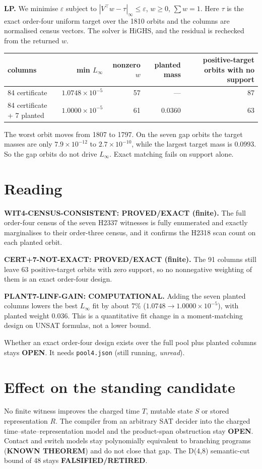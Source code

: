 \documentclass[11pt]{article}
\begin{document}
\textbf{LP.} We minimise $\varepsilon$ subject to $|V^{\top}w-\tau|_\infty\le\varepsilon$, $w\ge0$, $\sum w=1$. Here $\tau$ is the exact order-four uniform target over the 1810 orbits and the columns are normalised census vectors. The solver is HiGHS, and the residual is rechecked from the returned $w$.
\begin{center}\begin{tabular}{lrrrr}\toprule
columns & min $L_\infty$ & nonzero $w$ & planted mass & positive-target orbits with no support\\\midrule
84 certificate & $1.0748\times10^{-5}$ & 57 & --- & 87\\
84 certificate + 7 planted & $1.0000\times10^{-5}$ & 61 & 0.0360 & 63\\\bottomrule
\end{tabular}\end{center}
The worst orbit moves from 1807 to 1797. On the seven gap orbits the target masses are only $7.9\times10^{-12}$ to $2.7\times10^{-10}$, while the largest target mass is $0.0993$. So the gap orbits do not drive $L_\infty$. Exact matching fails on support alone.

\section*{Reading}
\textbf{WIT4-CENSUS-CONSISTENT: PROVED/EXACT (finite).} The full order-four census of the seven H2337 witnesses is fully enumerated and exactly marginalises to their order-three census, and it confirms the H2318 scan count on each planted orbit.

\textbf{CERT+7-NOT-EXACT: PROVED/EXACT (finite).} The 91 columns still leave 63 positive-target orbits with zero support, so no nonnegative weighting of them is an exact order-four design.

\textbf{PLANT7-LINF-GAIN: COMPUTATIONAL.} Adding the seven planted columns lowers the best $L_\infty$ fit by about 7\% ($1.0748\to1.0000\times10^{-5}$), with planted weight $0.036$. This is a quantitative fit change in a moment-matching design on UNSAT formulas, not a lower bound.

Whether an exact order-four design exists over the full pool plus planted columns stays \textbf{OPEN}. It needs \texttt{pool4.json} (still running, \emph{unread}).

\section*{Effect on the standing candidate}
No finite witness improves the charged time $T$, mutable state $S$ or stored representation $R$. The compiler from an arbitrary SAT decider into the charged time--state--representation model and the product-span obstruction stay \textbf{OPEN}. Contact and switch models stay polynomially equivalent to branching programs (\textbf{KNOWN THEOREM}) and do not close that gap. The D(4,8) semantic-cut bound of 48 stays \textbf{FALSIFIED/RETIRED}.
\end{document}
